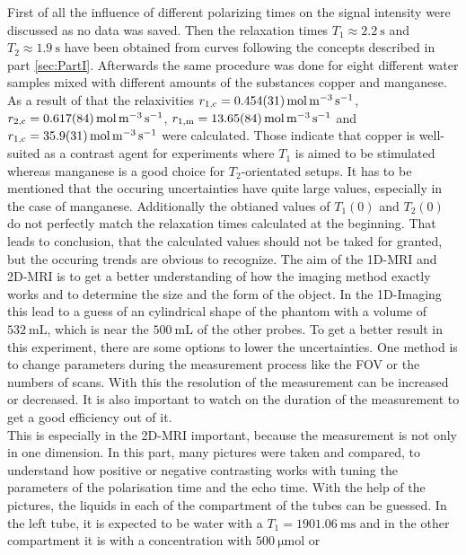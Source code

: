 First of all the influence of different polarizing times on the signal intensity were discussed as no data was saved. Then the relaxation times $T_1 \approx \SI{2.2}{\second}$ and $T_2 \approx \SI{1.9}{\second}$ have been obtained from curves following the concepts described in part \ref{sec:PartI}. Afterwards the same procedure was done for eight different water samples mixed with different amounts of the substances copper and manganese. As a result of that the relaxivities $r_{\text{1,c}} = \SI{0.454 \pm 0.031}{\mole \per \metre \tothe{3} \per \second}$, $r_{\text{2,c}} = \SI{0.617 \pm 0.084}{\mole \per \metre \tothe{3} \per \second}$, $r_{\text{1,m}} = \SI{13.65 \pm 0.84}{\mole \per \metre \tothe{3} \per \second}$ and $r_{\text{1,c}} = \SI{35.9 \pm 3.1}{\mole \per \metre \tothe{3} \per \second}$ were calculated. 
Those indicate that copper is well-suited as a contrast agent for experiments where $T_1$ is aimed to be stimulated whereas manganese is a good choice for $T_2$-orientated setups.
It has to be mentioned that the occuring uncertainties have quite large values, especially in the case of manganese.
Additionally the obtianed values of $T_1(0)$ and $T_2(0)$ do not perfectly match the relaxation times calculated at the beginning.
That leads to conclusion, that the calculated values should not be taked for granted, but the occuring trends are obvious to recognize.
The aim of the 1D-MRI and 2D-MRI is to get a better understanding of how the imaging method exactly works and to determine the size and the form of the object. In the 1D-Imaging this lead to a guess of an cylindrical shape of the phantom with a volume of $\SI{532}{\milli\liter}$, which is near the $\SI{500}{\milli\liter}$ of the other probes. To get a better result in this experiment, there are some options to lower the uncertainties. One method is to change parameters during the measurement process like the FOV or the numbers of scans. With this the resolution of the measurement can be increased or decreased. It is also important to watch on the duration of the measurement to get a good efficiency out of it. \\
This is especially in the 2D-MRI important, because the measurement is not only in one dimension. In this part, many pictures were taken and compared, to understand how positive or negative contrasting works with tuning the parameters of the polarisation time and the echo time. With the help of the pictures, the liquids in each of the compartment of the tubes can be guessed. In the left tube, it is expected to be water with a $T_1=\SI{1901,06}{\milli\s}$ and in the other compartment it is  with a concentration with $\SI{500}{\micro\mole}$ or 
